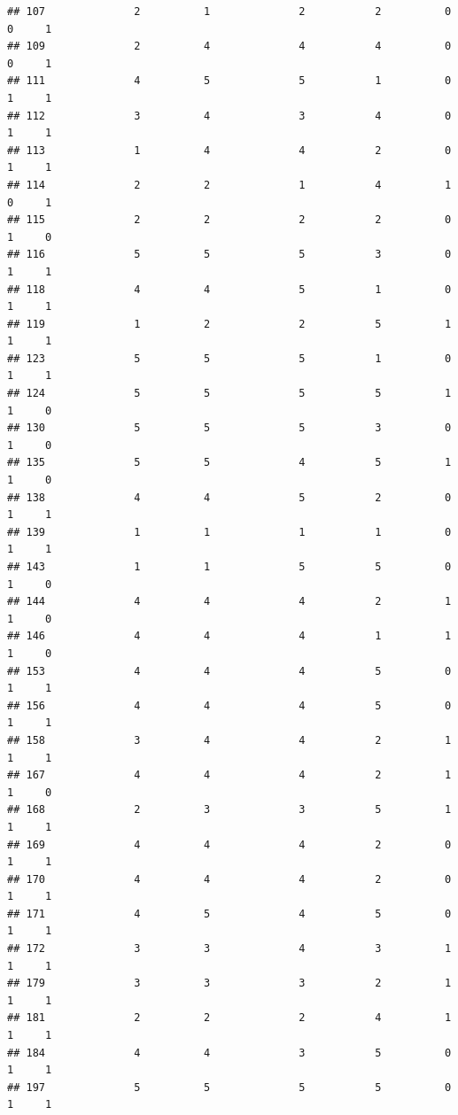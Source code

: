 \documentclass[
]{article}
\begin{document}
\begin{verbatim}
## 107              2          1              2           2          0    0     1
## 109              2          4              4           4          0    0     1
## 111              4          5              5           1          0    1     1
## 112              3          4              3           4          0    1     1
## 113              1          4              4           2          0    1     1
## 114              2          2              1           4          1    0     1
## 115              2          2              2           2          0    1     0
## 116              5          5              5           3          0    1     1
## 118              4          4              5           1          0    1     1
## 119              1          2              2           5          1    1     1
## 123              5          5              5           1          0    1     1
## 124              5          5              5           5          1    1     0
## 130              5          5              5           3          0    1     0
## 135              5          5              4           5          1    1     0
## 138              4          4              5           2          0    1     1
## 139              1          1              1           1          0    1     1
## 143              1          1              5           5          0    1     0
## 144              4          4              4           2          1    1     0
## 146              4          4              4           1          1    1     0
## 153              4          4              4           5          0    1     1
## 156              4          4              4           5          0    1     1
## 158              3          4              4           2          1    1     1
## 167              4          4              4           2          1    1     0
## 168              2          3              3           5          1    1     1
## 169              4          4              4           2          0    1     1
## 170              4          4              4           2          0    1     1
## 171              4          5              4           5          0    1     1
## 172              3          3              4           3          1    1     1
## 179              3          3              3           2          1    1     1
## 181              2          2              2           4          1    1     1
## 184              4          4              3           5          0    1     1
## 197              5          5              5           5          0    1     1

\end{verbatim}
\end{document}
